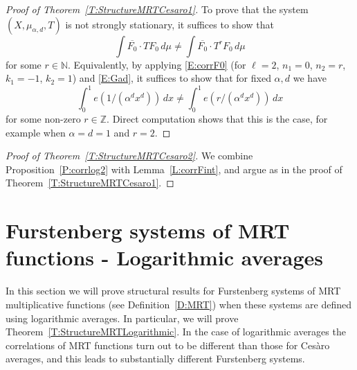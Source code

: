 \documentclass[11pt]{amsart}
\theoremstyle{definition}
\newcommand{\N}{{\mathbb N}}
\newcommand{\T}{{\mathbb T}}
\newcommand{\Z}{{\mathbb Z}}
\begin{document}
\begin{proof}[Proof of Theorem~\ref{T:StructureMRTCesaro1}]
To prove that the system $(X,\mu_{\alpha,d},T)$ is    not   strongly stationary,  it suffices to show that
$$
\int \overline{F_0} \cdot TF_0\, d\mu\neq 	\int \overline{F_0} \cdot T^rF_0\, d\mu
$$
for some $r\in \N$. Equivalently,    by applying  \eqref{E:corrF0} (for $\ell=2$, $n_1=0$, $n_2=r$, $k_1=-1$, $k_2=1$) and \eqref{E:Gad},  it suffices to show that for fixed $\alpha,d$ we have
$$
\int_0^1 e(1 / (\alpha^d x^d))\, dx\neq \int_0^1 e(r  /(\alpha^d x^d))\, dx
$$
for some non-zero $r\in \Z$. Direct computation shows that this is the case, for example when $\alpha=d=1$ and $r=2$.
\end{proof}

\begin{proof}[Proof of  Theorem~\ref{T:StructureMRTCesaro2}]
We combine   Proposition~\ref{P:corrlog2} with Lemma~\ref{L:corrFint},  and argue  as in the proof of Theorem~\ref{T:StructureMRTCesaro1}.
\end{proof}






 		 \section{Furstenberg systems of MRT functions - Logarithmic averages}\label{S:MRTlogarithmic}
 		 In this section we will prove structural results for Furstenberg systems of MRT multiplicative functions (see Definition~\ref{D:MRT}) when these systems are defined using logarithmic averages. In particular, we will prove Theorem~\ref{T:StructureMRTLogarithmic}. In the case of logarithmic averages
 	the correlations of  MRT functions turn out to be different than those for Ces\`aro averages, and this leads to substantially different Furstenberg systems.



 	
\end{document}

